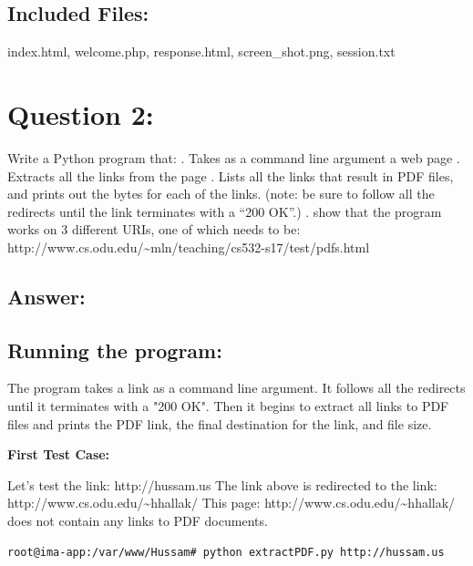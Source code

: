 \documentclass[a4paper, 11pt]{article}
\begin{document}
\subsection*{Included Files:}
index.html, welcome.php, response.html, screen\_shot.png, session.txt

\section*{Question 2:}
Write a Python program that:
\newline
{}. Takes as a command line argument a web page
\newline
{}. Extracts all the links from the page
\newline
{}. Lists all the links that result in PDF files, and prints out the bytes for each of the links. 
\newline
\indent
(note: be sure to follow all the redirects until the link terminates with a ``200 OK''.)
\newline
{}. show that the program works on 3 different URIs, one of which needs to be:
\newline
\indent
http://www.cs.odu.edu/\textasciitilde mln/teaching/cs532-s17/test/pdfs.html
     
\subsection*{Answer:} 


\subsection*{Running the program:}
The program takes a link as a command line argument. It follows all the redirects until it terminates with a "200 OK". Then it begins to extract all links to PDF files and prints the PDF link, the final destination for the link, and file size. 

\noindent
\textbf{First Test Case:}

Let's test the link: 
\newline
http://hussam.us 
\newline
The link above is redirected to the link:
\newline
http://www.cs.odu.edu/\textasciitilde hhallak/
\newline
\noindent
This page: http://www.cs.odu.edu/\textasciitilde hhallak/ does not contain any links to PDF documents.
\begin{lstlisting}[language=bash] 
root@ima-app:/var/www/Hussam# python extractPDF.py http://hussam.us
\end{lstlisting}
\end{document}
